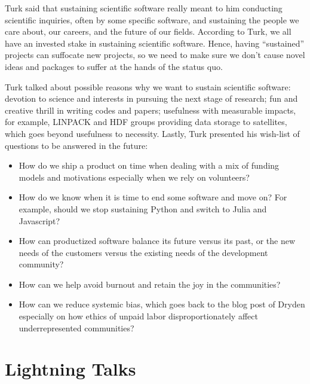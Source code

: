 \documentclass[11pt, oneside]{amsart}
\newcommand{\note}[1]{ {\textcolor{blueish}    { ***Note:      #1 }}}
\begin{document}
Turk said that sustaining scientific software really meant to him conducting
scientific inquiries, often by some specific software, and sustaining the people
we care about, our careers, and the future of our fields. According to Turk, we
all have an invested stake in sustaining scientific software. Hence, having
``sustained'' projects can suffocate new projects, so we need to make sure we
don't cause novel ideas and packages to suffer at the hands of the status quo.

Turk talked about possible reasons why we want to sustain scientific software:
devotion to science and interests in pursuing the next stage of research; fun
and creative thrill in writing codes and papers; usefulness with measurable
impacts, for example, LINPACK and HDF groups providing data storage to
satellites, which goes beyond usefulness to necessity. Lastly, Turk presented
his wish-list of questions to be answered in the future:
%
\begin{itemize} 

\item How do we ship a product on time when dealing with a mix of funding models
and motivations especially when we rely on volunteers?

\item How do we know when it is time to end some software and move on? For
example, should we stop sustaining Python and switch to Julia and Javascript?
 
\item How can productized software balance its future versus its past, or the
new needs of the customers versus the existing needs of the development
community?

\item How can we help avoid burnout and retain the joy in the communities?

\item How can we reduce systemic bias, which goes back to the blog post of
Dryden especially on how ethics of unpaid labor disproportionately affect
underrepresented communities?

\end{itemize}

\section{Lightning Talks} \label{sec:lightning}
\begin{comment}
\note{
\href{http://wssspe.researchcomputing.org.uk/wssspe3/agenda/}{Slides.}}
\end{comment}
\end{document}
